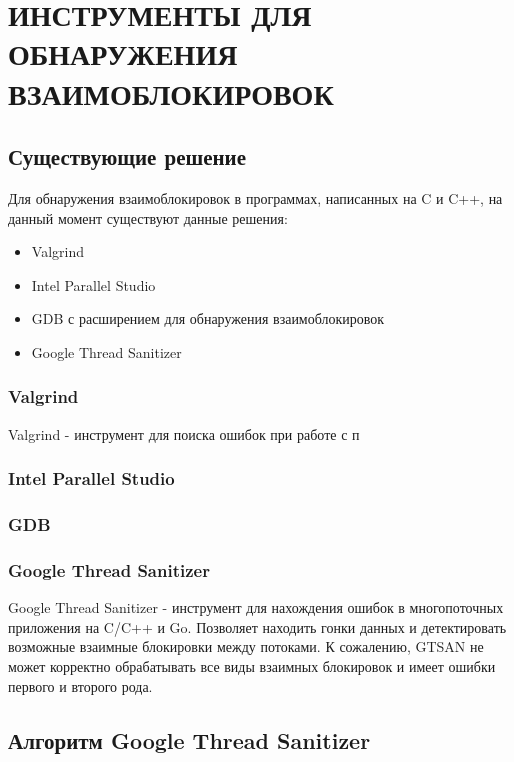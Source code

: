\chapter{\MakeUppercase{Инструменты для обнаружения взаимоблокировок}}

\section{Существующие решение}

Для обнаружения взаимоблокировок в программах, написанных на C и C++, на данный момент существуют данные решения:

\begin{itemize}  
\item Valgrind
\item Intel Parallel Studio
\item GDB с расширением для обнаружения взаимоблокировок
\item Google Thread Sanitizer
\end{itemize}

\subsection{Valgrind}

Valgrind \cite{ValgrindWiki} - инструмент для поиска ошибок при работе с п

\subsection{Intel Parallel Studio}

\subsection{GDB}

\subsection{Google Thread Sanitizer}

Google Thread Sanitizer - инструмент для нахождения ошибок в многопоточных приложения на C/C++ и Go. Позволяет находить гонки данных и детектировать возможные взаимные блокировки между потоками. К сожалению, GTSAN не может корректно обрабатывать все виды взаимных блокировок и имеет ошибки первого и второго рода.

\section{Алгоритм Google Thread Sanitizer}

